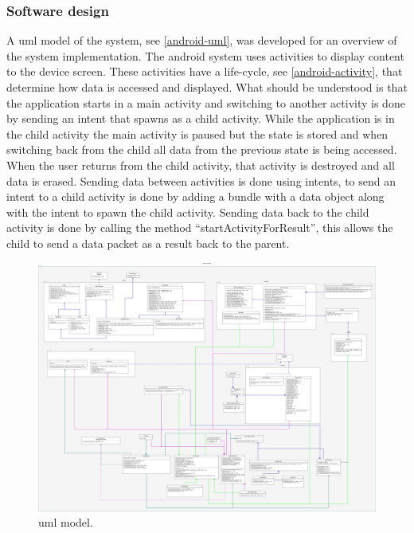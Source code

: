 \subsubsection{Software design}
A \gls{uml}\cite{uml} model of the system, see \autoref{android-uml}, was developed for an overview of the system implementation. The android system uses activities\cite{activity} to display content to the device screen. These activities have a life-cycle, see \autoref{android-activity}, that determine how data is accessed and displayed. What should be understood is that the application starts in a main activity and switching to another activity is done by sending an intent that spawns as a child activity. While the application is in the child activity the main activity is paused but the state is stored and when switching back from the child all data from the previous state is being accessed. When the user returns from the child activity,  that activity is destroyed and all data is erased. Sending data between activities is done using intents, to send an intent to a child activity is done by adding a bundle with a data object along with the intent to spawn the child activity. Sending data back to the child activity is done by calling the method ``startActivityForResult'', this allows the child to send a data packet as a result back to the parent. 
\begin{figure}[H]%
\centering
\includegraphics[width=\textwidth]{Figures/uml.png}
\caption{\gls{uml} model.}
\label{android-uml}
\end{figure}
